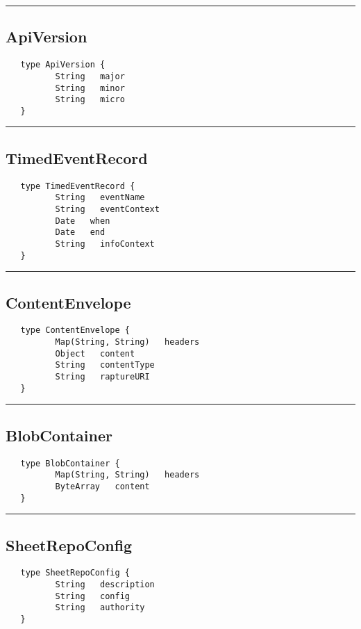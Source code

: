 \rule{15cm}{2pt}
\subsection{ApiVersion}
\label{type:ApiVersion}

\begin{verbatim}
   type ApiVersion {
          String   major
          String   minor
          String   micro
   }
\end{verbatim}

\rule{15cm}{2pt}
\subsection{TimedEventRecord}
\label{type:TimedEventRecord}

\begin{verbatim}
   type TimedEventRecord {
          String   eventName
          String   eventContext
          Date   when
          Date   end
          String   infoContext
   }
\end{verbatim}

\rule{15cm}{2pt}
\subsection{ContentEnvelope}
\label{type:ContentEnvelope}

\begin{verbatim}
   type ContentEnvelope {
          Map(String, String)   headers
          Object   content
          String   contentType
          String   raptureURI
   }
\end{verbatim}

\rule{15cm}{2pt}
\subsection{BlobContainer}
\label{type:BlobContainer}

\begin{verbatim}
   type BlobContainer {
          Map(String, String)   headers
          ByteArray   content
   }
\end{verbatim}

\rule{15cm}{2pt}
\subsection{SheetRepoConfig}
\label{type:SheetRepoConfig}

\begin{verbatim}
   type SheetRepoConfig {
          String   description
          String   config
          String   authority
   }
\end{verbatim}


